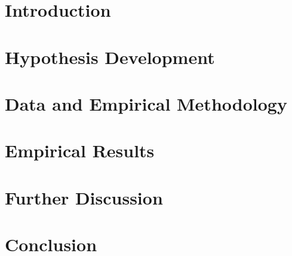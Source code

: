 \documentclass[a4paper, oneside,12pt]{article}
\begin{document}

%

\newpage


\newpage



\newpage
\tableofcontents
\newpage
\listoftables
\clearpage



\newpage
{}
\fontsize{13pt}{18pt}\selectfont
\section{Introduction}\label{ch:Introduction}



\fontsize{13pt}{18pt}\selectfont
\section{Hypothesis Development}\label{ch:Hypothesis}


\fontsize{13pt}{18pt}\selectfont
\section{Data and Empirical Methodology}\label{ch:method}


\fontsize{13pt}{18pt}\selectfont
\section{Empirical Results}\label{ch:results}



\fontsize{13pt}{18pt}\selectfont
\section{Further Discussion}\label{ch:info}



\fontsize{13pt}{18pt}\selectfont
\section{Conclusion}\label{ch:conclusion}



\newpage
\printbibliography


\fontsize{13pt}{18pt}\selectfont
\newpage

\end{document}
